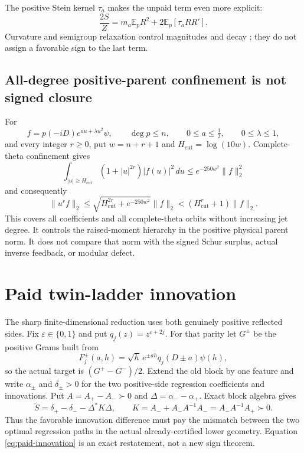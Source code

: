 \documentclass[11pt]{article}
\theoremstyle{definition}
\theoremstyle{remark}
\newcommand{\E}{\mathbb{E}}
\newcommand{\pd}{\succ 0}
\begin{document}
The positive Stein kernel $\tau_a$ makes the unpaid term even more explicit:
\begin{equation}
 \frac{2S}{Z}=m_a\E_pR^2+2\E_p[\tau_aRR'].
 \label{eq:stein-cost}
\end{equation}
Curvature and semigroup relaxation control magnitudes and decay
\cite{Gentil2010}; they do not
assign a favorable sign to the last term.

\subsection{All-degree positive-parent confinement is not signed closure}

For
\begin{equation}
 f=p(-iD)e^{au+\lambda u^2}\psi,\qquad
 \deg p\le n,\qquad 0\le a\le\tfrac12,\qquad0\le\lambda\le1,
\end{equation}
and every integer $r\ge0$, put $w=n+r+1$ and
$H_{\mathrm{cut}}=\log(10w)$. Complete-theta
confinement gives
\begin{equation}
 \int_{|u|\ge H_{\mathrm{cut}}}(1+|u|^{2r})|f(u)|^2\,du
 \le e^{-250w^2}\|f\|_2^2
 \label{eq:parent-confinement}
\end{equation}
and consequently
\begin{equation}
 \|u^rf\|_2
 \le\sqrt{H_{\mathrm{cut}}^{2r}+e^{-250w^2}}\|f\|_2
 <(H_{\mathrm{cut}}^r+1)\|f\|_2.
\end{equation}
This covers all coefficients and all complete-theta orbits without increasing
jet degree. It controls the raised-moment hierarchy in the positive physical
parent norm. It does not compare that norm with the signed Schur surplus,
actual inverse feedback, or modular defect.

\section{Paid twin-ladder innovation}

The sharp finite-dimensional reduction uses both genuinely positive reflected
sides. Fix $\varepsilon\in\{0,1\}$ and put
$q_j(z)=z^{\varepsilon+2j}$. For that parity let $G^\pm$ be the positive Grams
built from
\begin{equation}
 F_j^\pm(a,h)=\sqrt h\,e^{\pm ah}q_j(D\pm a)\psi(h),
\end{equation}
so the actual target is $(G^+-G^-)/2$. Extend the old block by one feature and
write $\alpha_\pm$ and $\delta_\pm>0$ for the two positive-side regression
coefficients and innovations. Put $A=A_+-A_-\pd$ and
$\Delta=\alpha_--\alpha_+$. Exact block algebra gives
\begin{equation}
 \widetilde S=\delta_+-\delta_- -\Delta^*K\Delta,
 \qquad
 K=A_-+A_-A^{-1}A_-=A_-A^{-1}A_+\pd.
 \label{eq:paid-innovation}
\end{equation}
Thus the favorable innovation difference must pay the mismatch between the two
optimal regression paths in the actual already-certified lower geometry.
Equation \eqref{eq:paid-innovation} is an exact restatement, not a new sign
theorem.
\end{document}
